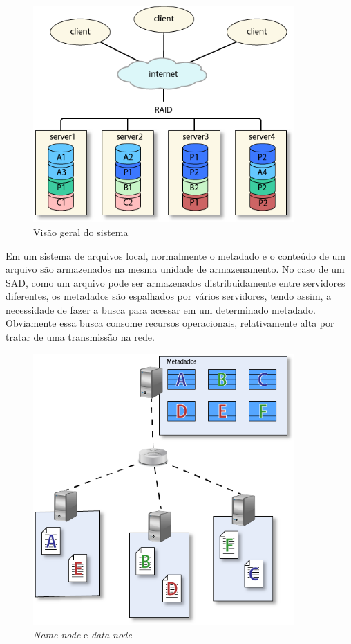 	\begin{figure}[htb]
		\begin{center}
			
			\includegraphics[clip,width=10.0cm]{images/image1.png}
			\caption{Visão geral do sistema}
			\label{fig:vis_sis}
		\end{center}
	\end{figure}
	
	Em um sistema de arquivos local, normalmente o metadado e o conteúdo de um arquivo são armazenados na mesma unidade de armazenamento. No caso de um SAD, como um arquivo pode ser armazenados distribuidamente entre servidores diferentes, os metadados são espalhados por vários servidores, tendo assim, a necessidade de fazer a busca para acessar em um determinado metadado. Obviamente essa busca consome recursos operacionais, relativamente alta por tratar de uma transmissão na rede.   \\
	
	\begin{figure}[htb]
		\begin{center}
			
			\includegraphics[clip,width=10.0cm]{images/image7.png}
			\caption{\textit{Name node} e \textit{data node}}
			\label{fig:namenode}
		\end{center}
	\end{figure}
	
